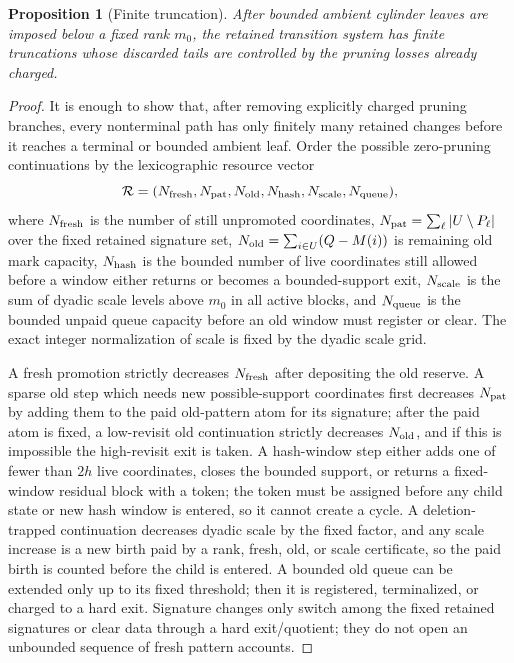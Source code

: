 \documentclass[11pt]{article}
\newtheorem{proposition}[theorem]{Proposition}
\theoremstyle{remark}
\begin{document}
\begin{proposition}[Finite truncation]\label{prop:finite-truncation}
After bounded ambient cylinder leaves are imposed below a fixed rank $m_0$, the retained transition system has finite truncations whose discarded tails are controlled by the pruning losses already charged.
\end{proposition}

\begin{proof}
It is enough to show that, after removing explicitly charged pruning branches, every nonterminal path has only finitely many retained changes before it reaches a terminal or bounded ambient leaf.  Order the possible zero-pruning continuations by the lexicographic resource vector
\[
        \mathcal R=(N_{\rm fresh},N_{\rm pat},N_{\rm old},N_{\rm hash},N_{\rm scale},N_{\rm queue}),
\]
where $N_{\rm fresh}$ is the number of still unpromoted coordinates, $N_{\rm pat}=\sum_\ell |U\setminus P_\ell|$ over the fixed retained signature set, $N_{\rm old}=\sum_{i\in U}(Q-M(i))$ is remaining old mark capacity, $N_{\rm hash}$ is the bounded number of live coordinates still allowed before a window either returns or becomes a bounded-support exit, $N_{\rm scale}$ is the sum of dyadic scale levels above $m_0$ in all active blocks, and $N_{\rm queue}$ is the bounded unpaid queue capacity before an old window must register or clear.  The exact integer normalization of scale is fixed by the dyadic scale grid.

A fresh promotion strictly decreases $N_{\rm fresh}$ after depositing the old reserve.  A sparse old step which needs new possible-support coordinates first decreases $N_{\rm pat}$ by adding them to the paid old-pattern atom for its signature; after the paid atom is fixed, a low-revisit old continuation strictly decreases $N_{\rm old}$, and if this is impossible the high-revisit exit is taken.  A hash-window step either adds one of fewer than $2h$ live coordinates, closes the bounded support, or returns a fixed-window residual block with a token; the token must be assigned before any child state or new hash window is entered, so it cannot create a cycle.  A deletion-trapped continuation decreases dyadic scale by the fixed factor, and any scale increase is a new birth paid by a rank, fresh, old, or scale certificate, so the paid birth is counted before the child is entered.  A bounded old queue can be extended only up to its fixed threshold; then it is registered, terminalized, or charged to a hard exit.  Signature changes only switch among the fixed retained signatures or clear data through a hard exit/quotient; they do not open an unbounded sequence of fresh pattern accounts.


\end{proof}
\end{document}
